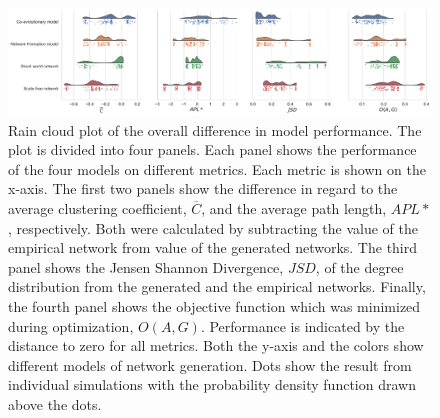 \documentclass[11pt]{article}
\begin{document}
\begin{figure}[H]
    \centering
    \includegraphics[width=.99\linewidth]{../plots/overall/Model_Evaluation_Overview.pdf}
  \caption{Rain cloud plot of the overall difference in model performance. The plot is divided into four panels. Each panel shows the performance of the four models on different metrics. Each metric is shown on the x-axis. The first two panels show the difference in regard to the average clustering coefficient, $\overline{C}$, and the average path length, $APL*$, respectively. Both were calculated by subtracting the value of the empirical network from value of the generated networks. The third panel shows the Jensen Shannon Divergence, $JSD$, of the degree distribution from the generated and the empirical networks. Finally, the fourth panel shows the objective function which was minimized during optimization, $O(A,G)$. Performance is indicated by the distance to zero for all metrics. Both the y-axis and the colors show different models of network generation. Dots show the result from individual simulations with the probability density function drawn above the dots.}
  \label{fig:eval_overall}
\end{figure}
\end{document}
